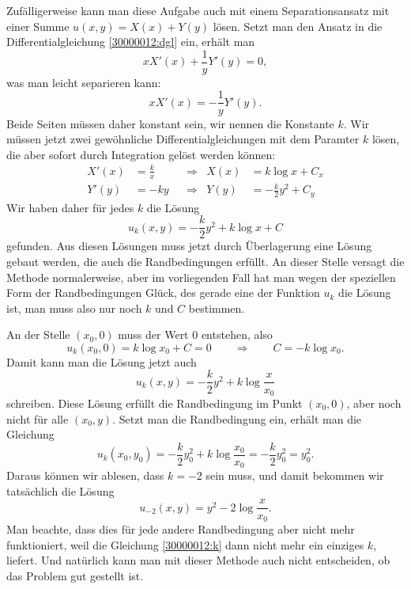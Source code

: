 \begin{diskussion}
Zufälligerweise kann man diese Aufgabe auch mit einem Separationsansatz
mit einer Summe $u(x,y)= X(x) + Y(y)$ lösen.
Setzt man den Ansatz in die Differentialgleichung \eqref{30000012:dgl} ein,
erhält man
\[
xX'(x) +\frac1yY'(y)=0,
\]
was man leicht separieren kann:
\[
xX'(x) = - \frac1yY'(y).
\]
Beide Seiten müssen daher konstant sein, wir nennen die Konstante $k$.
Wir müssen jetzt zwei gewöhnliche Differentialgleichungen mit dem Paramter
$k$ lösen, die aber sofort durch Integration gelöst werden können:
\begin{align*}
X'(x)&=\frac{k}{x}&&\Rightarrow&X(x)&=k\log x + C_x      \\
Y'(y)&=-ky        &&\Rightarrow&Y(y)&=-\frac{k}2y^2 + C_y
\end{align*}
Wir haben daher für jedes $k$ die Lösung
\[
u_k(x,y)=-\frac{k}2 y^2 + k\log x + C
\]
gefunden.
Aus diesen Lösungen muss jetzt durch Überlagerung eine Lösung 
gebaut werden, die auch die Randbedingungen erfüllt.
An dieser Stelle versagt die Methode normalerweise, aber im vorliegenden
Fall hat man wegen der speziellen Form der Randbedingungen Glück, des
gerade eine der Funktion $u_k$ die Lösung ist, man muss also
nur noch $k$ und $C$ bestimmen.

An der Stelle $(x_0,0)$ muss der Wert $0$ entstehen, also
\[
u_k(x_0,0) = k\log x_0 + C=0
\qquad\Rightarrow\qquad C=-k\log x_0.
\]
Damit kann man die Lösung jetzt auch
\[
u_k(x,y)=-\frac{k}{2}y^2 +k\log\frac{x}{x_0}
\]
schreiben.
Diese Lösung erfüllt die Randbedingung im Punkt $(x_0,0)$, aber noch
nicht für alle $(x_0,y)$.
Setzt man die Randbedingung ein, erhält man die Gleichung
\begin{equation}
u_k(x_0,y_0) = -\frac{k}{2}y_0^2 +k\log\frac{x_0}{x_0} = -\frac{k}{2}y_0^2=y_0^2.
\label{30000012:k}
\end{equation}
Daraus können wir ablesen, dass $k=-2$ sein muss, und damit bekommen
wir tatsächlich die Lösung
\[
u_{-2}(x,y)=y^2 -2\log\frac{x}{x_0}.
\]
Man beachte, dass dies für jede andere Randbedingung aber nicht mehr
funktioniert, weil die Gleichung \eqref{30000012:k} dann nicht mehr
ein einziges $k$, liefert.
Und natürlich kann man mit dieser Methode auch nicht entscheiden, ob
das Problem gut gestellt ist.


\end{diskussion}
